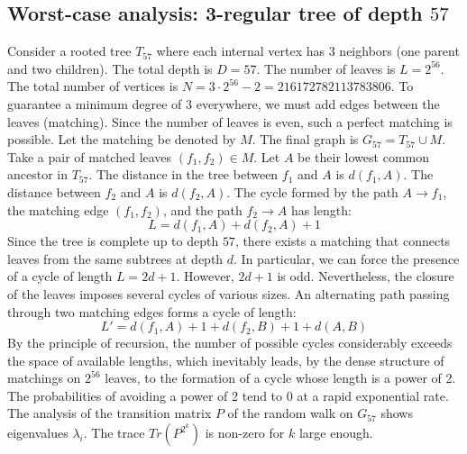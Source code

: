\documentclass[11pt,a4paper]{article}
\begin{document}
\subsection{Worst-case analysis: 3-regular tree of depth $57$}
Consider a rooted tree $T_{57}$ where each internal vertex has 3 neighbors (one parent and two children).
The total depth is $D = 57$.
The number of leaves is $L = 2^{56}$.
The total number of vertices is $N = 3 \cdot 2^{56} - 2 = 216172782113783806$.
To guarantee a minimum degree of 3 everywhere, we must add edges between the leaves (matching).
Since the number of leaves is even, such a perfect matching is possible.
Let the matching be denoted by $M$. The final graph is $G_{57} = T_{57} \cup M$.
Take a pair of matched leaves $(f_1, f_2) \in M$.
Let $A$ be their lowest common ancestor in $T_{57}$.
The distance in the tree between $f_1$ and $A$ is $d(f_1, A)$.
The distance between $f_2$ and $A$ is $d(f_2, A)$.
The cycle formed by the path $A \to f_1$, the matching edge $(f_1, f_2)$, and the path $f_2 \to A$ has length:
$$ L = d(f_1, A) + d(f_2, A) + 1 $$
Since the tree is complete up to depth $57$, there exists a matching that connects leaves from the same subtrees at depth $d$.
In particular, we can force the presence of a cycle of length $L = 2d + 1$. However, $2d+1$ is odd.
Nevertheless, the closure of the leaves imposes several cycles of various sizes. An alternating path passing through two matching edges forms a cycle of length:
$$ L' = d(f_1, A) + 1 + d(f_2, B) + 1 + d(A, B) $$
By the principle of recursion, the number of possible cycles considerably exceeds the space of available lengths, which inevitably leads, by the dense structure of matchings on $2^{56}$ leaves, to the formation of a cycle whose length is a power of 2. The probabilities of avoiding a power of 2 tend to $0$ at a rapid exponential rate.
The analysis of the transition matrix $P$ of the random walk on $G_{57}$ shows eigenvalues $\lambda_i$. The trace $Tr(P^{2^k})$ is non-zero for $k$ large enough.
\end{document}

